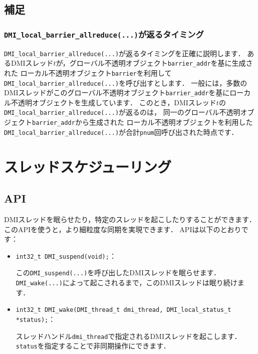 \documentclass[report,12pt]{jsbook}
\begin{document}
\subsection{補足}

\subsubsection{\texttt{DMI\_local\_barrier\_allreduce(...)}が返るタイミング}

\texttt{DMI\_local\_barrier\_allreduce(...)}が返るタイミングを正確に説明します．
あるDMIスレッド$t$が，グローバル不透明オブジェクト\texttt{barrier\_addr}を基に生成された
ローカル不透明オブジェクト\texttt{barrier}を利用して\texttt{DMI\_local\_barrier\_allreduce(...)}を呼び出すとします．
一般には，多数のDMIスレッドがこのグローバル不透明オブジェクト\texttt{barrier\_addr}を基にローカル不透明オブジェクトを生成しています．
このとき，DMIスレッド$t$の\texttt{DMI\_local\_barrier\_allreduce(...)}が返るのは，
同一のグローバル不透明オブジェクト\texttt{barrier\_addr}から生成された
ローカル不透明オブジェクトを利用した\texttt{DMI\_local\_barrier\_allreduce(...)}が合計\texttt{pnum}回呼び出された時点です．

\section{スレッドスケジューリング}

\subsection{API}

DMIスレッドを眠らせたり，特定のスレッドを起こしたりすることができます．
このAPIを使うと，より細粒度な同期を実現できます．
APIは以下のとおりです：
\begin{itemize}
\item \texttt{int32\_t DMI\_suspend(void);}：
  
  この\texttt{DMI\_suspend(...)}を呼び出したDMIスレッドを眠らせます．
  \texttt{DMI\_wake(...)}によって起こされるまで，このDMIスレッドは眠り続けます．
\item \texttt{int32\_t DMI\_wake(DMI\_thread\_t dmi\_thread, DMI\_local\_status\_t *status);}：
  
  スレッドハンドル\texttt{dmi\_thread}で指定されるDMIスレッドを起こします．
  \texttt{status}を指定することで非同期操作にできます．
\end{itemize}
\end{document}
